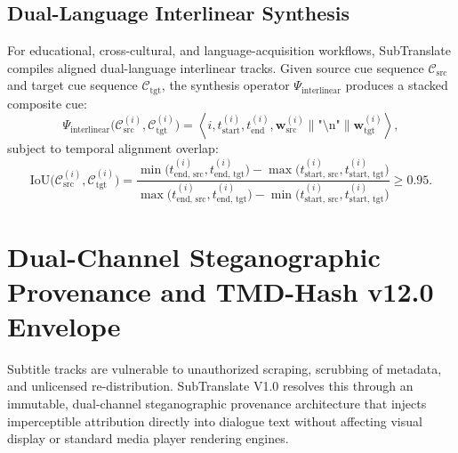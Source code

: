 \documentclass[11pt,a4paper,reqno]{article}
\theoremstyle{definition}
\theoremstyle{remark}
\begin{document}
\subsection{Dual-Language Interlinear Synthesis}
For educational, cross-cultural, and language-acquisition workflows, SubTranslate compiles aligned dual-language interlinear tracks. Given source cue sequence $\mathcal{C}_{\text{src}}$ and target cue sequence $\mathcal{C}_{\text{tgt}}$, the synthesis operator $\Psi_{\text{interlinear}}$ produces a stacked composite cue:
\begin{equation}
\Psi_{\text{interlinear}}\bigl(\mathcal{C}_{\text{src}}^{(i)}, \mathcal{C}_{\text{tgt}}^{(i)}\bigr) = \left\langle i, t_{\text{start}}^{(i)}, t_{\text{end}}^{(i)}, \mathbf{w}_{\text{src}}^{(i)} \parallel \text{"\textbackslash n"} \parallel \mathbf{w}_{\text{tgt}}^{(i)} \right\rangle,
\end{equation}
subject to temporal alignment overlap:
\begin{equation}
\mathrm{IoU}\bigl(\mathcal{C}_{\text{src}}^{(i)}, \mathcal{C}_{\text{tgt}}^{(i)}\bigr) = \frac{\min\bigl(t_{\text{end, src}}^{(i)}, t_{\text{end, tgt}}^{(i)}\bigr) - \max\bigl(t_{\text{start, src}}^{(i)}, t_{\text{start, tgt}}^{(i)}\bigr)}{\max\bigl(t_{\text{end, src}}^{(i)}, t_{\text{end, tgt}}^{(i)}\bigr) - \min\bigl(t_{\text{start, src}}^{(i)}, t_{\text{start, tgt}}^{(i)}\bigr)} \ge 0.95.
\end{equation}

\section{Dual-Channel Steganographic Provenance and TMD-Hash v12.0 Envelope}
\label{sec:steganography}

Subtitle tracks are vulnerable to unauthorized scraping, scrubbing of metadata, and unlicensed re-distribution. SubTranslate V1.0 resolves this through an immutable, dual-channel steganographic provenance architecture that injects imperceptible attribution directly into dialogue text without affecting visual display or standard media player rendering engines.
\end{document}
